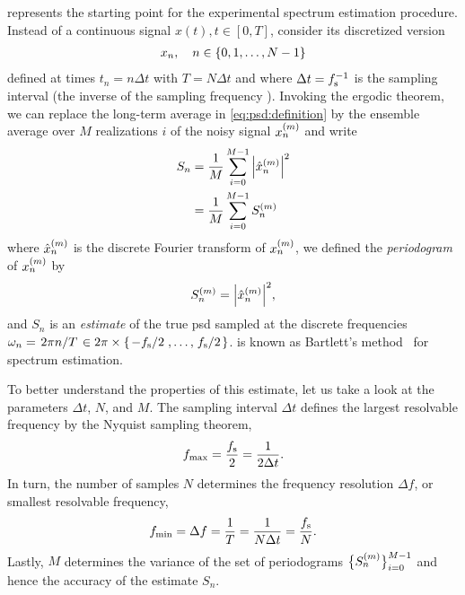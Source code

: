  represents the starting point for the experimental spectrum estimation procedure.
Instead of a continuous signal $x(t), t\in [0, T]$, consider its discretized version
\begin{align}\label{eq:signal:discrete}
    x_n \qc n\in\lbrace 0, 1, \dotsc, N - 1\rbrace
\end{align}
defined at times $t_n = n\Delta t$ with $T = N\Delta t$ and where $\Delta t = f_{\mathrm{s}}^{-1}$ is the sampling interval (the inverse of the sampling frequency \fs).
Invoking the ergodic theorem, we can replace the long-term average in \cref{eq:psd:definition} by the ensemble average over $M$ realizations $i$ of the noisy signal $x_n^{(m)}$ and write
\begin{align}\label{eq:psd:bartlett}
    S_n &= \frac{1}{M} \sum_{i=0}^{M-1} \abs{\hat{x}_n^{(m)}}^2 \\
        &= \frac{1}{M} \sum_{i=0}^{M-1} S_n^{(m)}
\end{align}
where $\hat{x}_n^{(m)}$ is the discrete Fourier transform of $x_n^{(m)}$, we defined the \emph{periodogram} of $x_n^{(m)}$ by
\begin{align}\label{eq:periodogram}
    S_n^{(m)} = \abs{\hat{x}_n^{(m)}}^2,
\end{align}
and $S_n$ is an \emph{estimate} of the true \gls{psd} sampled at the discrete frequencies $\omega_n = \flatfrac{2\pi n}{T} \in 2\pi\times\lbrace\flatfrac{-\fs}{2}, \dotsc, \flatfrac{\fs}{2}\rbrace$.
 is known as Bartlett's method~\cite{Bartlett1948} for spectrum estimation.

To better understand the properties of this estimate, let us take a look at the parameters $\Delta t$, $N$, and $M$.
The sampling interval $\Delta t$ defines the largest resolvable frequency by the Nyquist sampling theorem,
\begin{align}\label{eq:f_max}
    f_{\mathrm{max}} = \frac{f_{\mathrm{s}}}{2} = \frac{1}{2\Delta t}.
\end{align}
In turn, the number of samples $N$ determines the frequency resolution $\Delta f$, or smallest resolvable frequency,
\begin{align}\label{eq:f_min}
    f_{\mathrm{min}} = \Delta f = \frac{1}{T} = \frac{1}{N\Delta t} = \frac{f_{\mathrm{s}}}{N}.
\end{align}
Lastly, $M$ determines the variance of the set of periodograms $\bigl\lbrace S_n^{(m)}\bigr\rbrace_{i=0}^{M-1}$ and hence the accuracy of the estimate $S_n$.

